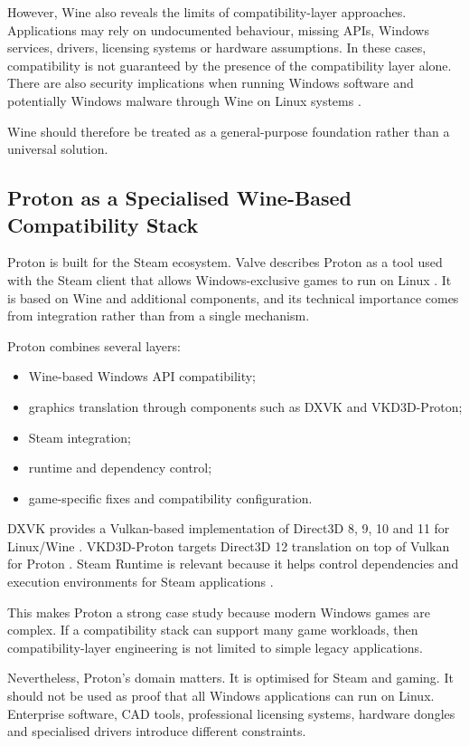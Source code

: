 \documentclass[conference]{IEEEtran}
\begin{document}
However, Wine also reveals the limits of compatibility-layer approaches. Applications may rely on undocumented behaviour, missing APIs, Windows services, drivers, licensing systems or hardware assumptions. In these cases, compatibility is not guaranteed by the presence of the compatibility layer alone. There are also security implications when running Windows software and potentially Windows malware through Wine on Linux systems \cite{duncan2019wineSecurity}.

Wine should therefore be treated as a general-purpose foundation rather than a universal solution.

\subsection{Proton as a Specialised Wine-Based Compatibility Stack}

Proton is built for the Steam ecosystem. Valve describes Proton as a tool used with the Steam client that allows Windows-exclusive games to run on Linux \cite{valveProton}. It is based on Wine and additional components, and its technical importance comes from integration rather than from a single mechanism.

Proton combines several layers:
\begin{itemize}
    \item Wine-based Windows API compatibility;
    \item graphics translation through components such as DXVK and VKD3D-Proton;
    \item Steam integration;
    \item runtime and dependency control;
    \item game-specific fixes and compatibility configuration.
\end{itemize}

DXVK provides a Vulkan-based implementation of Direct3D 8, 9, 10 and 11 for Linux/Wine \cite{dxvk}. VKD3D-Proton targets Direct3D 12 translation on top of Vulkan for Proton \cite{vkd3dProton}. Steam Runtime is relevant because it helps control dependencies and execution environments for Steam applications \cite{steamRuntime}.

This makes Proton a strong case study because modern Windows games are complex. If a compatibility stack can support many game workloads, then compatibility-layer engineering is not limited to simple legacy applications.

Nevertheless, Proton's domain matters. It is optimised for Steam and gaming. It should not be used as proof that all Windows applications can run on Linux. Enterprise software, CAD tools, professional licensing systems, hardware dongles and specialised drivers introduce different constraints.
\end{document}
